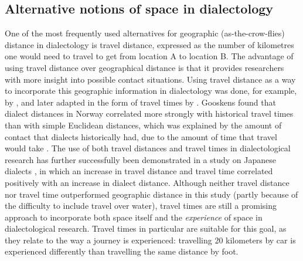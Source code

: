 \documentclass[output=paper,colorlinks,citecolor=brown,draft]{langscibook}
\begin{document}
\subsection{Alternative notions of space in dialectology}
One of the most frequently used alternatives for geographic (as-the-crow-flies) distance in dialectology is travel distance, expressed as the number of kilometres one would need to travel to get from location A to location B. The advantage of using travel distance over geographical distance is that it provides researchers with more insight into possible contact situations. Using travel distance as a way to incorporate this geographic information in dialectology was done, for example, by \citet{van_gemert_het_2002}, and later adapted in the form of travel times by \citet{gooskens_norwegian_2004}. Gooskens found that dialect distances in Norway correlated more strongly with historical travel times than with simple Euclidean distances, which was explained by the amount of contact that dialects historically had, due to the amount of time that travel would take \citep{gooskens_norwegian_2004}. The use of both travel distances and travel times in dialectological research has further successfully been demonstrated in a study on Japanese dialects \citep{jeszenszky_japanese_2019}, in which an increase in travel distance and travel time correlated positively with an increase in dialect distance. Although neither travel distance nor travel time outperformed geographic distance in this study (partly because of the difficulty to include travel over water), travel times are still a promising approach to incorporate both space itself and the \textit{experience} of space in dialectological research. Travel times in particular are suitable for this goal, as they relate to the way a journey is experienced: travelling 20 kilometers by car is experienced differently than travelling the same distance by foot. 
\end{document}
